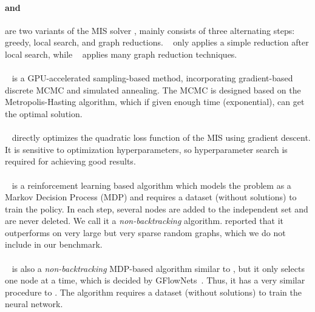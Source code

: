 \paragraph{\onlinemis and \redumis} 
are two variants of the MIS solver \kamis, mainly consists of three alternating steps: greedy, local search, and graph reductions. \onlinemis~\citep{dahlum2016accelerating} only applies a simple reduction after local search, while \redumis~\cite{lamm2017finding} applies many graph reduction techniques. 

\paragraph{\isco}~\citep{sun2023revisiting} is a GPU-accelerated sampling-based method, incorporating gradient-based discrete MCMC and simulated annealing. The MCMC is designed based on the Metropolis-Hasting algorithm, which if given enough time (exponential),  can get the optimal solution.

\paragraph{\pcqo}~\citep{alkhouri2024dataless} directly optimizes the quadratic loss function of the MIS using gradient descent. It is sensitive to optimization hyperparameters, so hyperparameter search is required for achieving good results.

\paragraph{\lwd}~\citep{ahn2020learning} is a reinforcement learning based algorithm which models the problem as a Markov Decision Process (MDP) and requires a dataset (without solutions) to train the policy. In each step, several nodes are added to the independent set and are never deleted. We call it a \emph{non-backtracking} algorithm. 
\citet{ahn2020learning} reported that it outperforms \kamis on very large but very sparse random graphs, which we do not include in our benchmark.

\paragraph{\gflownets}~\citep{zhang2023let} is also a \emph{non-backtracking} MDP-based algorithm similar to \lwd, but it only selects one node at a time, which is decided by GFlowNets~\citep{bengio2021flow}. Thus, it has a very similar procedure to \deggreedy. The algorithm requires a dataset (without solutions) to train the neural network.

